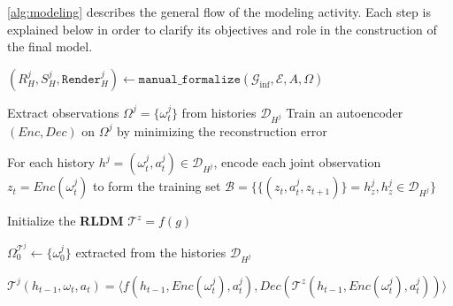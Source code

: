 \documentclass[pdflatex,sn-mathphys-num]{sn-jnl}%
\theoremstyle{thmstyleone}%
\theoremstyle{thmstyletwo}%
\theoremstyle{thmstylethree}%
\begin{document}
\autoref{alg:modeling} describes the general flow of the modeling activity.
Each step is explained below in order to clarify its objectives and role in the construction of the final model.


\begin{algorithm}[h!]
    \caption{Algorithmic view of the modeling activity.}
    \label{alg:modeling}
    \DontPrintSemicolon
    
    
    \vspace{0.5em}
    $(R^j_H, S^j_H, \texttt{Render}^j_H) \gets \texttt{manual\_formalize}(\mathcal{G}_{\text{inf}}, \mathcal{E}, A, \Omega)$ \;
    
    \vspace {0.5em}
    
    \vspace{0.5em}
    Extract observations $\Omega^j = \{\omega^j_t\}$ from histories $\mathcal{D}_{H^j}$ \;
    Train an autoencoder $(Enc, Dec)$ on $\Omega^j$ by minimizing the reconstruction error \;
    
    \vspace{0.5em}
    For each history $h^j = (\omega_t^j, a_t^j) \in \mathcal{D}_{H^j}$, encode each joint observation ${z}_t = Enc(\omega^j_t)$ to form the training set $\mathcal{B} = \{ \{(z_t, a^j_t, z_{t+1})\} = h_z^j, h_z^j \in \mathcal{D}_{H^j}\}$
    
    \vspace{0.5em}
    Initialize the \textbf{RLDM} $\mathcal{T}^z = f(g)$
    
    
    \vspace{0.5em}
    
    $\Omega^{\mathcal{T}^j}_0 \gets \{\omega^j_0\}$ extracted from the histories $\mathcal{D}_{H^j}$
    
    $\mathcal{T}^j(h_{t-1}, \omega_t, a_t) = \langle f(h_{t-1}, Enc(\omega^j_t), a^j_t), Dec(\mathcal{T}^{z}(h_{t-1}, Enc(\omega^j_t), a^j_t)) \rangle$ \;
    
    \vspace{0.5em}
\end{algorithm}
\end{document}
